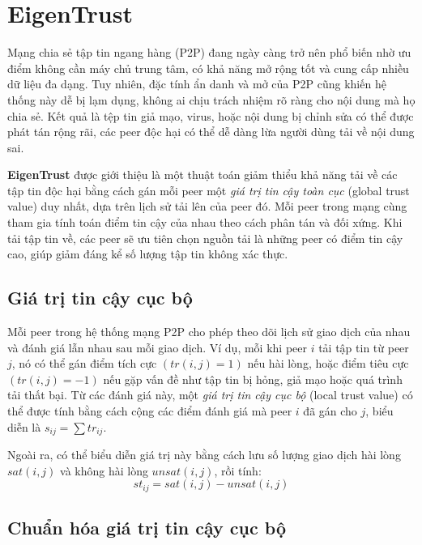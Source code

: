 \section{EigenTrust}

Mạng chia sẻ tập tin ngang hàng (P2P) đang ngày càng trở nên phổ biến nhờ ưu điểm không cần máy chủ trung tâm, có khả năng mở rộng tốt và cung cấp nhiều dữ liệu đa dạng.
Tuy nhiên, đặc tính ẩn danh và mở của P2P cũng khiến hệ thống này dễ bị lạm dụng, không ai chịu trách nhiệm rõ ràng cho nội dung mà họ chia sẻ. Kết quả là
tệp tin giả mạo, virus, hoặc nội dung bị chỉnh sửa có thể được phát tán rộng rãi, các peer độc hại có thể dễ dàng lừa người dùng tải về nội dung sai.

\textbf{EigenTrust} \cite{eigentrust-algorithm-for-reputation-management-in-2p2-networks} được giới thiệu là một thuật toán giảm thiểu khả năng tải về các tập tin độc hại
bằng cách gán mỗi peer một \textit{giá trị tin cậy toàn cục} (global trust value) duy nhất, dựa trên lịch sử tải lên của peer đó. Mỗi peer trong mạng cùng tham gia tính toán điểm tin cậy của nhau
theo cách phân tán và đối xứng. Khi tải tập tin về, các peer sẽ ưu tiên chọn nguồn tải là những peer có điểm tin cậy cao, giúp giảm đáng kể số lượng tập tin không xác thực.

\subsection{Giá trị tin cậy cục bộ}

Mỗi peer trong hệ thống mạng P2P cho phép theo dõi lịch sử giao dịch của nhau và đánh giá lẫn nhau sau mỗi giao dịch. Ví dụ, mỗi khi peer $i$ tải tập tin từ
peer $j$, nó có thể gán điểm tích cực $(tr(i, j) = 1)$ nếu hài lòng, hoặc điểm tiêu cực $(tr(i, j) = -1)$ nếu gặp vấn đề như tập tin bị hỏng, giả mạo hoặc quá trình tải thất bại.
Từ các đánh giá này, một \textit{giá trị tin cậy cục bộ} (local trust value) có thể được tính bằng cách cộng các điểm đánh giá mà peer $i$ đã gán cho $j$, biểu diễn là $s_{ij}=\sum tr_{ij}$.

Ngoài ra, có thể biểu diễn giá trị này bằng cách lưu số lượng giao dịch hài lòng $sat(i, j)$ và không hài lòng $unsat(i, j)$, rồi tính:
\[st_{ij} = sat(i, j) - unsat(i, j)\]

\subsection{Chuẩn hóa giá trị tin cậy cục bộ}

